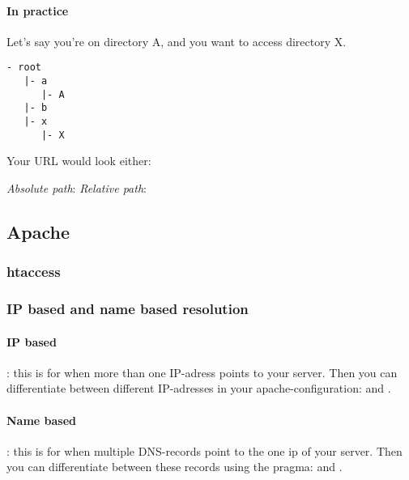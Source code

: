 \paragraph{In practice} Let's say you're on directory A, and you want to access directory X.

\begin{lstlisting}
- root
   |- a
      |- A
   |- b
   |- x
      |- X
\end{lstlisting}
      
Your URL would look either:

\emph{Absolute path}: 
\emph{Relative path}: 












\subsection{Apache}

\subsubsection{htaccess}

\subsubsection{IP based and name based resolution}

\paragraph{IP based}: this is for when more than one IP-adress points to your server. Then you can differentiate between different IP-adresses in your apache-configuration:  and .

\paragraph{Name based}: this is for when multiple DNS-records point to the one ip of your server. Then you can differentiate between these records using the  pragma:  and .

